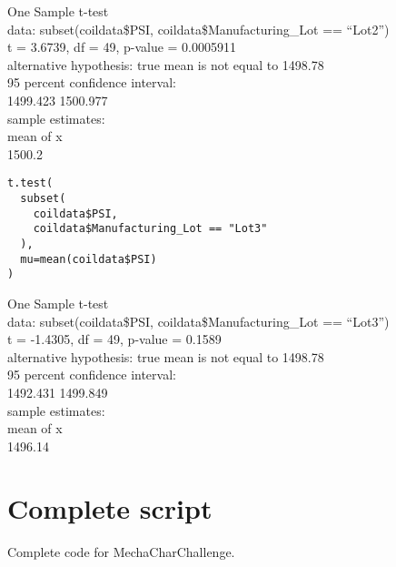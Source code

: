 \documentclass[11pt]{article}
\begin{document}
\begin{org}


One Sample t-test\\

data:  subset(coildata\$PSI, coildata\$Manufacturing\_Lot == ``Lot2'')\\
t = 3.6739, df = 49, p-value = 0.0005911\\
alternative hypothesis: true mean is not equal to 1498.78\\
95 percent confidence interval:\\
 1499.423 1500.977\\
sample estimates:\\
mean of x\\
   1500.2\\
\end{org}

\begin{verbatim}
t.test(
  subset(
    coildata$PSI,
    coildata$Manufacturing_Lot == "Lot3"
  ),
  mu=mean(coildata$PSI)
)
\end{verbatim}

\begin{org}


One Sample t-test\\

data:  subset(coildata\$PSI, coildata\$Manufacturing\_Lot == ``Lot3'')\\
t = -1.4305, df = 49, p-value = 0.1589\\
alternative hypothesis: true mean is not equal to 1498.78\\
95 percent confidence interval:\\
 1492.431 1499.849\\
sample estimates:\\
mean of x\\
  1496.14\\
\end{org}

\section{Complete script}
\label{sec:org30156b6}

Complete code for MechaCharChallenge.\\
\end{document}

